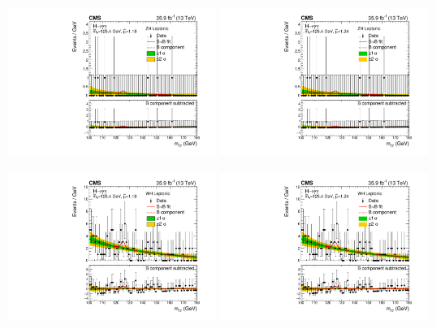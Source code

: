 \begin{figure}[h!]
    \begin{center}
        \includegraphics[width=0.49\textwidth]{figures/appendix_mass_plots/CMS-HIG-16-040_Figure_013-a.pdf}
        \includegraphics[width=0.49\textwidth]{figures/appendix_mass_plots/SBplots_jackWSnewOldTTHZHLeptonicTag_13TeV.pdf}
    \end{center}
    \begin{center}
        \includegraphics[width=0.49\textwidth]{figures/appendix_mass_plots/CMS-HIG-16-040_Figure_013-b.pdf}
        \includegraphics[width=0.49\textwidth]{figures/appendix_mass_plots/SBplots_jackWSnewOldTTHWHLeptonicTag_13TeV.pdf}
    \end{center}

\end{figure}
